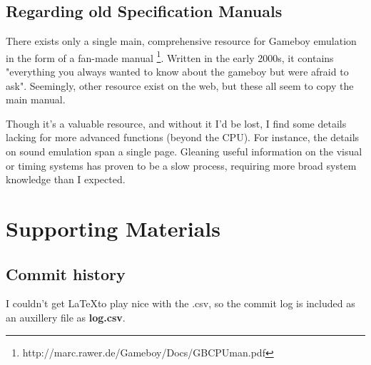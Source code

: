 \documentclass{article}
\begin{document}
    \subsection{Regarding old Specification Manuals} \label{gripes}
    There exists only a single main, comprehensive resource for Gameboy emulation in the form of a fan-made manual \footnote{http://marc.rawer.de/Gameboy/Docs/GBCPUman.pdf}. 
    Written in the early 2000s, it contains "everything you always wanted to know about the gameboy but were afraid to ask".
    Seemingly, other resource exist on the web, but these all seem to copy the main manual.
    \par
    Though it's a valuable resource, and without it I'd be lost, I find some details lacking for more advanced functions (beyond the CPU). 
    For instance, the details on sound emulation span a single page. 
    Gleaning useful information on the visual or timing systems has proven to be a slow process, 
    requiring more broad system knowledge than I expected.
\section{Supporting Materials}
    \subsection{Commit history}
    I couldn't get \LaTeX to play nice with the .csv, so the commit log is included as an auxillery file as \textbf{log.csv}.
\end{document}
